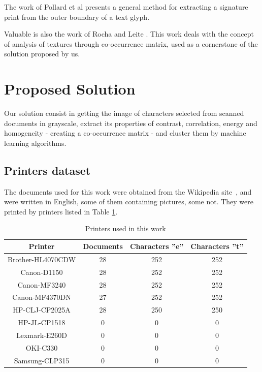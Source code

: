 \documentclass[10pt,twocolumn,letterpaper]{article}
\begin{document}
The work of Pollard et al \cite{Pollard} presents a general method for extracting a signature print from the outer boundary of a text glyph.

Valuable is also the work of Rocha and Leite \cite{Rocha}. This work deals with the concept of analysis of textures through co-occurrence matrix, used as a cornerstone of the solution proposed by us.

\section{Proposed Solution}
\label{sec:proposed_solution}

Our solution consist in getting the image of characters selected from scanned documents in grayscale, extract its properties of contrast, correlation, energy and homogeneity - creating a co-occurrence matrix - and cluster them by machine learning algorithms.

\subsection{Printers dataset}
\label{subsec:printers_dataset}

The documents used for this work were obtained from the Wikipedia site~\cite{Wikipedia}, and were written in English, some of them containing pictures, some not. They were printed by printers listed in Table \ref{tab:printers}. 






\begin{table}
\caption{Printers used in this work}
\label{tab:printers}
\begin{center}
    \begin{tabular}{ | c | c | c | c |}
    \hline
Printer & Documents & Characters ''e'' & Characters ''t'' \\ \hline
Brother-HL4070CDW & 28 & 252 & 252\\
Canon-D1150 & 28 & 252 & 252\\
Canon-MF3240 & 28 & 252 & 252\\
Canon-MF4370DN & 27 & 252 & 252 \\
HP-CLJ-CP2025A & 28 & 250 & 250\\
HP-JL-CP1518 & 0 & 0 & 0\\
Lexmark-E260D & 0 & 0 & 0\\
OKI-C330 & 0 & 0 & 0\\
Samsung-CLP315 & 0 & 0 & 0 \\
\hline
    \end{tabular}
\end{center}    
\end{table}
\end{document}
